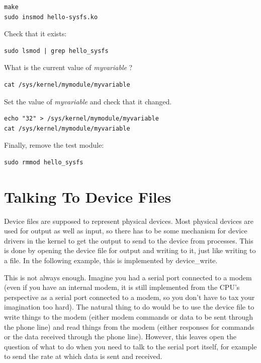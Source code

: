 \documentclass[11pt]{article}
\begin{document}
\begin{verbatim}
make
sudo insmod hello-sysfs.ko
\end{verbatim}

Check that it exists:

\begin{verbatim}
sudo lsmod | grep hello_sysfs
\end{verbatim}

What is the current value of \emph{myvariable} ?

\begin{verbatim}
cat /sys/kernel/mymodule/myvariable
\end{verbatim}

Set the value of \emph{myvariable} and check that it changed.

\begin{verbatim}
echo "32" > /sys/kernel/mymodule/myvariable
cat /sys/kernel/mymodule/myvariable
\end{verbatim}

Finally, remove the test module:

\begin{verbatim}
sudo rmmod hello_sysfs
\end{verbatim}

\section*{Talking To Device Files}
\label{sec:org80eb1cf}
Device files are supposed to represent physical devices. Most physical devices are used for output as well as input, so there has to be some mechanism for device drivers in the kernel to get the output to send to the device from processes. This is done by opening the device file for output and writing to it, just like writing to a file. In the following example, this is implemented by device\_write.

This is not always enough. Imagine you had a serial port connected to a modem (even if you have an internal modem, it is still implemented from the CPU's perspective as a serial port connected to a modem, so you don't have to tax your imagination too hard). The natural thing to do would be to use the device file to write things to the modem (either modem commands or data to be sent through the phone line) and read things from the modem (either responses for commands or the data received through the phone line). However, this leaves open the question of what to do when you need to talk to the serial port itself, for example to send the rate at which data is sent and received.
\end{document}
